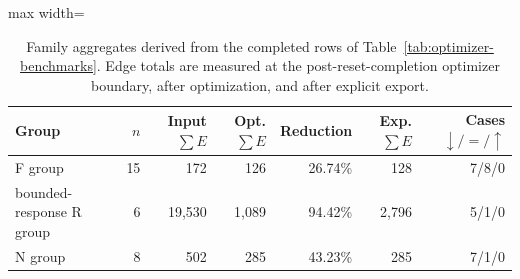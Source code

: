 \begin{table}[tp]
\centering
\caption{Family aggregates derived from the completed rows of Table~\ref{tab:optimizer-benchmarks}. Edge totals are measured at the post-reset-completion optimizer boundary, after optimization, and after explicit export.}
\label{tab:optimizer-aggregates}
\scriptsize
\setlength{\tabcolsep}{3pt}
\begin{adjustbox}{max width=\textwidth}\begin{tabular}{@{}p{}rrrrrr@{}}
\toprule
Group & $n$ & Input $\sum E$ & Opt. $\sum E$ & Reduction & Exp. $\sum E$ & Cases $\downarrow/= /\uparrow$\\
\midrule
F group & 15 & 172 & 126 & 26.74\% & 128 & 7/8/0 \\
bounded-response R group & 6 & 19,530 & 1,089 & 94.42\% & 2,796 & 5/1/0 \\
N group & 8 & 502 & 285 & 43.23\% & 285 & 7/1/0 \\
\bottomrule
\end{tabular}\end{adjustbox}
\end{table}
